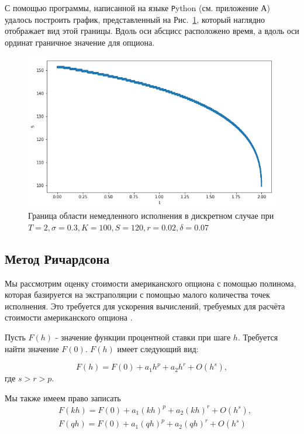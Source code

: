 \documentclass[oneside,final,12pt]{article}
\begin{document}
С помощью программы, написанной на языке {\texttt Python} (см. приложение А) удалось построить график, представленный на Рис.~\ref{discrete}, который наглядно отображает вид этой границы. Вдоль оси абсцисс расположено время, а вдоль оси ординат граничное значение для опциона.
\begin{figure}[h]
\centering
\includegraphics[scale=0.6]{Discrete.png}
\caption{Граница области немедленного исполнения в дискретном случае при \newline $T=2, \sigma=0.3, K=100, S=120, r=0.02, \delta=0.07$}
\label{discrete}
\end{figure} 

\newpage
\subsection{Метод Ричардсона}

Мы рассмотрим оценку стоимости американского опциона с помощью полинома, которая базируется на экстраполяции с помощью малого количества точек исполнения. Это требуется для ускорения вычислений, требуемых для расчёта стоимости американского опциона \cite{geske}.

\bigskip \noindent
Пусть $F(h)$ - значение функции процентной ставки при шаге $h$. Требуется найти значение $F(0)$. 
$F(h)$ имеет следующий вид:

$$
F(h) = F(0)+a_1 h^p + a_2 h^r + O(h^s),
$$
\noindent где $s>r>p$.

\noindent Мы также имеем право записать
\begin{align*}
& F(kh) = F(0)+a_1 (kh)^p + a_2 (kh)^r + O(h^s), \\
& F(qh) = F(0)+a_1 (qh)^p + a_2 (qh)^r + O(h^s)
\end{align*}
\end{document}
